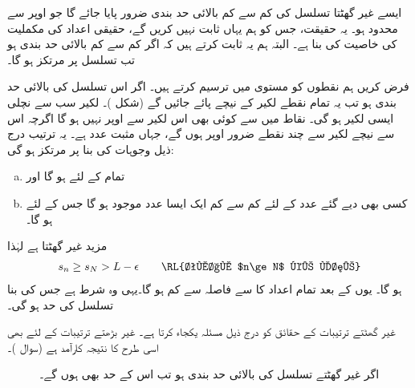 ایسے غیر گھٹتا تسلسل کی کم سے کم بالائی حد بندی ضرور پایا جائے گا جو اوپر سے محدود ہو۔ یہ حقیقت، جس کو ہم یہاں ثابت نہیں کریں گے، حقیقی اعداد کی مکملیت کی خاصیت کی بنا ہے۔ البتہ ہم یہ ثابت کرتے ہیں کہ اگر  کم سے کم بالائی حد بندی ہو تب  تسلسل  پر مرتکز ہو گا۔

فرض کریں ہم   نقطوں کو  مستوی میں ترسیم کرتے ہیں۔ اگر اس تسلسل کی بالائی حد بندی   ہو تب یہ تمام نقطے لکیر  کے نیچے پائے جائیں گے (شکل )۔ لکیر  سب سے نچلی ایسی لکیر ہو گی۔ نقاط  میں سے کوئی بھی اس لکیر سے اوپر نہیں ہو گا اگرچہ اس سے نیچے لکیر  سے چند نقطے  ضرور اوپر  ہوں گے، جہاں  مثبت عدد ہے۔ یہ ترتیب درج ذیل وجوہات کی بنا  پر مرتکز ہو گی:
\begin{enumerate}[a.]
\item
تمام  کے لئے  ہو گا اور
\item
کسی بھی دیے گئے عدد  کے لئے کم سے کم ایک ایسا عدد  موجود ہو گا جس کے لئے  ہو گا۔
\end{enumerate}
مزید  غیر گھٹتا ہے لہٰذا
\begin{align*} 
s_n\ge s_N>L-\epsilon\quad\quad  \text{\RL{تمام $n\ge N$ کے لئے}}
\end{align*}
ہو گا۔ یوں  کے بعد تمام اعداد  کا  سے فاصلہ  سے کم ہو گا۔یہی وہ شرط ہے جس کی بنا تسلسل  کی حد  ہو گی۔

غیر گھٹتے ترتیبات کے حقائق کو درج ذیل مسئلہ  یکجاء کرتا ہے۔ غیر بڑھتے ترتیبات کے لئے بھی اسی طرح کا نتیجہ  کارآمد ہے (سوال )۔
\begin{figure}
\centering
{}
\caption{اگر غیر گھٹتے تسلسل کی بالائی حد بندی  ہو تب اس کے حد  بھی ہوں گے۔}
\label{شکل_تسلسل_بالائی_حد_بندی_اور_حد}
\end{figure}

